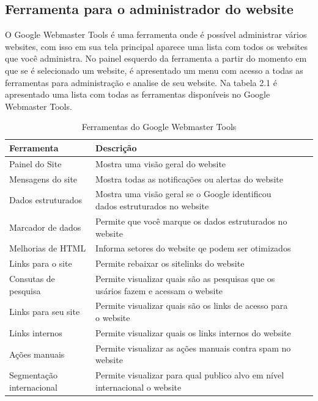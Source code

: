 \documentclass[
	12pt,				%
	openright,			%
	twoside,			%
	a4paper,			%
	english,			%
	french,				%
	spanish,			%
	brazil				%
	]{abntex2}
\begin{document}
\subsection{Ferramenta para o administrador do website}

O Google Webmaster Tools é uma ferramenta onde é possível administrar vários websites, com isso em sua tela principal aparece uma lista com todos os websites que você administra. No painel esquerdo da ferramenta a partir do momento em que se é selecionado um website, é apresentado um menu com acesso a todas as ferramentas para administração e analise de seu website. Na tabela 2.1 é apresentado uma lista com todas as ferramentas disponíveis no Google Webmaster Tools.

\begin{table}[htb]
\ABNTEXfontereduzida
\caption[Ferramentas do Google Webmaster Tools]{Ferramentas do Google Webmaster Tools}
\label{tab-nivinv}
\begin{center}
\begin{tabular}{p{2.6cm}|p{6.0cm}|p{2.25cm}|p{3.40cm}}
   \textbf{Ferramenta} & \textbf{Descrição} \\
    \hline
    Painel do Site & Mostra uma visão geral do website \\
    \hline
    Mensagens do site & Mostra todas as notificações ou alertas do website \\
    \hline
    Dados estruturados & Mostra uma visão geral se o Google identificou dados estruturados no website \\
    \hline
    Marcador de dados & Permite que você marque os dados estruturados no website \\
    \hline
    Melhorias de HTML & Informa setores do website qe podem ser otimizados \\
    \hline
    Links para o site & Permite rebaixar os sitelinks do website \\
    \hline
    Consutas de pesquisa & Permite visualizar quais são as pesquisas que os usários fazem e acessam o website \\
    \hline
    Links para seu site & Permite visualizar quais são os links de acesso para o website \\
    \hline
    Links internos & Permite visualizar quais os links internos do website \\
    \hline
    Ações manuais & Permite visualizar as ações manuais contra spam no website \\
    \hline
    Segmentação internacional & Permite visualizar para qual publico alvo em nível internacional o website \\

\end{tabular}
\end{center}
\end{table}
\end{document}
